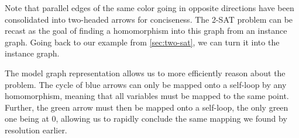 \begin{center}
\end{center}

Note that parallel edges of the same color going in opposite directions have been consolidated into two-headed arrows for conciseness. The 2-SAT problem can be recast as the goal of finding a homomorphism into this graph from an instance graph. Going back to our example from \ref{sec:two-sat}, we can turn it into the instance graph.

\begin{center}
\end{center}

The model graph representation allows us to more efficiently reason about the problem. The cycle of blue arrows can only be mapped onto a self-loop by any homomorphism, meaning that all variables must be mapped to the same point. Further, the green arrow must then be mapped onto a self-loop, the only green one being at $0$, allowing us to rapidly conclude the same mapping we found by resolution earlier.

